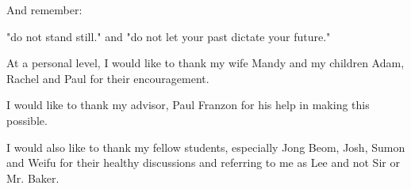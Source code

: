 \begin{biography}

And remember:

"do not stand still." and
"do not let your past dictate your future."


\end{biography}

\begin{acknowledgements}
At a personal level, I would like to thank my wife Mandy and my children Adam, Rachel and Paul for their encouragement.

I would like to thank my advisor, Paul Franzon for his help in making this possible.

I would also like to thank my fellow students, especially Jong Beom, Josh, Sumon and Weifu for their healthy discussions and referring to me as Lee and not Sir or Mr. Baker.

\end{acknowledgements}


\iftrue

\thesistableofcontents

\thesislistoftables

\thesislistoffigures

\fi
